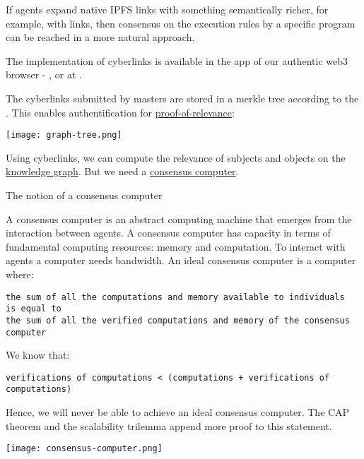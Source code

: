\documentclass[8pt,oneside]{amsart}
\makeatletter
\newcommand{\linkred}[2]{\href{#1}{\color{red}{#2}}}
\newcommand{\linkgreen}[2]{\href{#1}{\color{green}{#2}}}
\renewcommand\subsection{\@startsection{subsection}
                                    {2}{\z@}
                                    {-3.25ex\@plus -1ex \@minus -.2ex}
                                    {0ex \@plus .2ex}
                                    {\play\Large}
                        }
\newcommand{\titleSection}[1]{\subsection{#1}}
\newenvironment{Figure}
  {\par\medskip\noindent\minipage{\linewidth}}
  {\endminipage\par\medskip}
\makeatother
\begin{document}
If agents expand native IPFS links with something semantically richer, for example, with
\linkred{https://github.com/cybercongress/cyb/blob/dev/docs/dura.md}{dura}
links, then consensus on the execution rules by a specific program can be reached in a more natural approach. 

The \linkred{https://github.com/cybercongress/go-cyber}{сyberd} implementation of cyberlinks is available in the \linkred{https://github.com/cybercongress/dot-cyber}{.cyber} app of our authentic web3 browser - \linkred{https://cyb.ai}{cyb}, or at \linkred{http://cyber.page}{cyber.page}.

The cyberlinks submitted by masters are stored in a merkle tree according to the \linkgreen{https://ipfs.io/ipfs/QmZpJLmc3T2L1FLUxzvU3P8MBCPe15fEmUyVS7Bz8ZKMhG}{RFC-6962 standard}. This enables authentification for {\hyperref[proof-of-relevance]{proof-of-relevance}}:

\begin{Figure}
    \centering
    \texttt{[image: graph-tree.png]}
\end{Figure}

Using cyberlinks, we can compute the relevance of subjects and objects on the {\hyperref[knowledge-graph]{knowledge graph}}. But we need a {\hyperref[consensus-computer]{consensus computer}}.

\titleSection{The notion of a consensus computer}\label{consensus-computer}

A consensus computer is an abstract computing machine that emerges from the interaction between agents. A consensus computer has capacity in terms of fundamental computing resources: memory and computation. To interact with agents a computer needs bandwidth. An ideal consensus computer is a computer where:
\\
\begin{lstlisting}
the sum of all the computations and memory available to individuals
is equal to
the sum of all the verified computations and memory of the consensus computer
\end{lstlisting}

We know that:
\begin{lstlisting}
verifications of computations < (computations + verifications of computations)
\end{lstlisting}

Hence, we will never be able to achieve an ideal consensus computer. The CAP theorem and the scalability trilemma append more proof to this statement.
\begin{Figure}
    \centering
    \texttt{[image: consensus-computer.png]}
\end{Figure}
\end{document}
